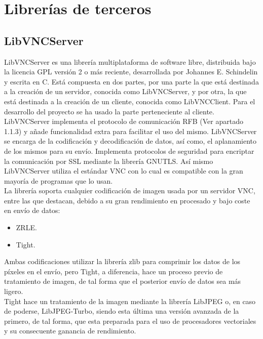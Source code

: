 \section{Librerías de terceros}
\subsection{LibVNCServer}
LibVNCServer\cite{LibVNC:LibVNC} es una librería multiplataforma de software libre, distribuida bajo la licencia GPL versión 2 o más reciente, desarrollada por Johannes E. Schindelin y escrita en C. Está compuesta en dos partes, por una parte la que está destinada a la creación de un servidor, conocida como LibVNCServer, y por otra, la que está destinada a la creación de un cliente, conocida como LibVNCClient. Para el desarrollo del proyecto se ha usado la parte perteneciente al cliente.\\

LibVNCServer implementa el protocolo de comunicación RFB (Ver apartado 1.1.3) y añade funcionalidad extra para facilitar el uso del mismo. LibVNCServer se encarga de la codificación y decodificación de datos, así como, el aplanamiento de los mismos para su envío. Implementa protocolos de seguridad para encriptar la comunicación por SSL mediante la librería GNUTLS. Así mismo LibVNCServer utiliza el estándar VNC con lo cual es compatible con la gran mayoría de programas que lo usan.\\

La librería soporta cualquier codificación de imagen usada por un servidor VNC, entre las que destacan, debido a su gran rendimiento en procesado y bajo coste en envío de datos:
\begin{itemize}
\item ZRLE.
\item Tight.
\end{itemize}

Ambas codificaciones utilizar la librería zlib para comprimir los datos de los píxeles en el envío, pero Tight, a diferencia, hace un proceso previo de tratamiento de imagen, de tal forma que el posterior envío de datos sea más ligero.\\

Tight hace un tratamiento de la imagen mediante la librería LibJPEG o, en caso de poderse, LibJPEG-Turbo, siendo esta última una versión avanzada de la primero, de tal forma, que esta preparada para el uso de procesadores vectoriales y su consecuente ganancia de rendimiento.\\

